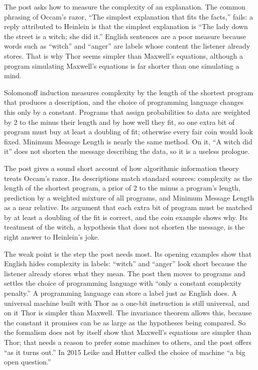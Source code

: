 \begin{afterword}
\summaryhead

The post asks how to measure the complexity of an explanation. The common phrasing of Occam's razor, ``The simplest explanation that fits the facts,'' fails: a reply attributed to Heinlein is that the simplest explanation is ``The lady down the street is a witch; she did it.'' English sentences are a poor measure because words such as ``witch'' and ``anger'' are labels whose content the listener already stores. That is why Thor seems simpler than Maxwell's equations, although a program simulating Maxwell's equations is far shorter than one simulating a mind.

Solomonoff induction measures complexity by the length of the shortest program that produces a description, and the choice of programming language changes this only by a constant. Programs that assign probabilities to data are weighted by 2 to the minus their length and by how well they fit, so one extra bit of program must buy at least a doubling of fit; otherwise every fair coin would look fixed. Minimum Message Length is nearly the same method. On it, ``A witch did it'' does not shorten the message describing the data, so it is a useless prologue.

\responsehead

The post gives a sound short account of how algorithmic information theory treats Occam's razor. Its descriptions match standard sources: complexity as the length of the shortest program, a prior of 2 to the minus a program's length, prediction by a weighted mixture of all programs, and Minimum Message Length as a near relative. Its argument that each extra bit of program must be matched by at least a doubling of the fit is correct, and the coin example shows why. Its treatment of the witch, a hypothesis that does not shorten the message, is the right answer to Heinlein's joke.

The weak point is the step the post needs most. Its opening examples show that English hides complexity in labels: ``witch'' and ``anger'' look short because the listener already stores what they mean. The post then moves to programs and settles the choice of programming language with ``only a constant complexity penalty.'' A programming language can store a label just as English does. A universal machine built with Thor as a one-bit instruction is still universal, and on it Thor is simpler than Maxwell. The invariance theorem allows this, because the constant it promises can be as large as the hypotheses being compared. So the formalism does not by itself show that Maxwell's equations are simpler than Thor; that needs a reason to prefer some machines to others, and the post offers ``as it turns out.'' In 2015 Leike and Hutter called the choice of machine ``a big open question.''


\end{afterword}
